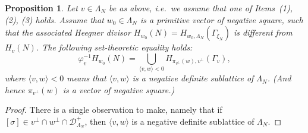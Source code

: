 \documentclass[11pt]{amsart}
\numberwithin{equation}{subsection}
\theoremstyle{plain}
\newtheorem{proposition}[theorem]{Proposition}
\theoremstyle{remark}
\theoremstyle{definition}
\newcommand{\cD}{{\mathscr D}}
\newcommand{\la}{\langle}
\newcommand{\ra}{\rangle}
\begin{document}
%
%
\begin{proposition}\label{prp:interhyp}
%
Let $v\in\Lambda_N$ be as above, i.e.~we assume  that one of Items~(1), (2), (3) holds.
 Assume that $w_0\in\Lambda_N$ is a primitive vector of negative square, such that the associated Heegner divisor $H_{w_0}(N)=H_{w_0,\Lambda_N}(\Gamma_{\xi_{N}})$ is different from $H_v(N)$. The following set-theoretic equality holds:
%
\begin{equation*}
%
\varphi_v^{-1} H_{w_0}(N)=\bigcup_{\la v,w\ra <0} H_{\pi_{v^{\bot}}(w),v^{\bot}}(\Gamma_v),
%
\end{equation*}
%
where $\la v,w\ra <0$  means that $\la v,w\ra$ is a negative definite sublattice of $\Lambda_N$. (And hence $\pi_{v^{\bot}}(w)$ is a vector of negative square.)
%
\end{proposition}
%
%
\begin{proof}
%
There  is a single observation to make, namely  that if $[\sigma]\in v^{\bot}\cap w^{\bot}\cap\cD^{+}_{\Lambda_N}$, then $\la v,w\ra$ is a negative definite sublattice of 
$\Lambda_N$.
%
\end{proof}
%
%
\end{document}
